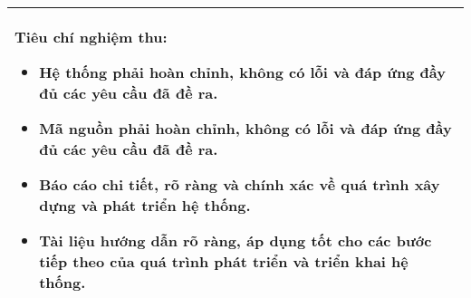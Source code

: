 \begin{longtable}{|p{\textwidth}|}
\begin{minipage}{\textwidth}
        \noindent\textbf{Tiêu chí nghiệm thu:}
        \begin{itemize}
            \item Hệ thống phải hoàn chỉnh, không có lỗi và đáp ứng đầy đủ các yêu cầu đã đề ra.
            \item Mã nguồn phải hoàn chỉnh, không có lỗi và đáp ứng đầy đủ các yêu cầu đã đề ra.
            \item Báo cáo chi tiết, rõ ràng và chính xác về quá trình xây dựng và phát triển hệ thống.
            \item Tài liệu hướng dẫn rõ ràng, áp dụng tốt cho các bước tiếp theo của quá trình phát triển và triển khai hệ thống.
        \end{itemize}
    \end{minipage} \\
    \hline
\end{longtable}
